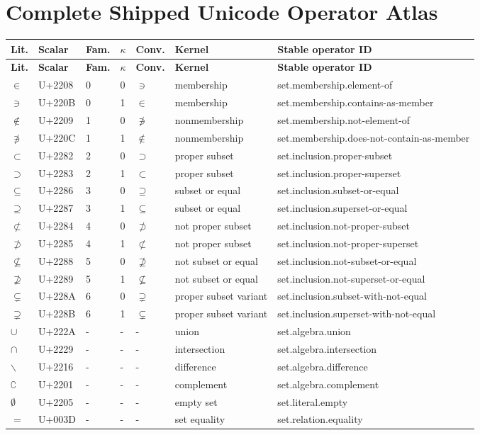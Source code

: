 \documentclass[11pt,a4paper]{article}
\begin{document}
\section{Complete Shipped Unicode Operator Atlas}
\small
{}
\begin{longtable}{P{7mm}P{18mm}P{10mm}P{10mm}P{10mm}P{27mm}P{65mm}}
\toprule
\textbf{Lit.} & \textbf{Scalar} & \textbf{Fam.} & \textbf{\(\kappa\)} & \textbf{Conv.} & \textbf{Kernel} & \textbf{Stable operator ID}\\
\midrule
\endfirsthead
\toprule
\textbf{Lit.} & \textbf{Scalar} & \textbf{Fam.} & \textbf{\(\kappa\)} & \textbf{Conv.} & \textbf{Kernel} & \textbf{Stable operator ID}\\
\midrule
\endhead
\bottomrule
\endlastfoot
\(∈\) & U+2208 & 0 & 0 & \(∋\) & membership & set.membership.element-of \\
\(∋\) & U+220B & 0 & 1 & \(∈\) & membership & set.membership.contains-as-member \\
\(∉\) & U+2209 & 1 & 0 & \(∌\) & nonmembership & set.membership.not-element-of \\
\(∌\) & U+220C & 1 & 1 & \(∉\) & nonmembership & set.membership.does-not-contain-as-member \\
\(⊂\) & U+2282 & 2 & 0 & \(⊃\) & proper subset & set.inclusion.proper-subset \\
\(⊃\) & U+2283 & 2 & 1 & \(⊂\) & proper subset & set.inclusion.proper-superset \\
\(⊆\) & U+2286 & 3 & 0 & \(⊇\) & subset or equal & set.inclusion.subset-or-equal \\
\(⊇\) & U+2287 & 3 & 1 & \(⊆\) & subset or equal & set.inclusion.superset-or-equal \\
\(⊄\) & U+2284 & 4 & 0 & \(⊅\) & not proper subset & set.inclusion.not-proper-subset \\
\(⊅\) & U+2285 & 4 & 1 & \(⊄\) & not proper subset & set.inclusion.not-proper-superset \\
\(⊈\) & U+2288 & 5 & 0 & \(⊉\) & not subset or equal & set.inclusion.not-subset-or-equal \\
\(⊉\) & U+2289 & 5 & 1 & \(⊈\) & not subset or equal & set.inclusion.not-superset-or-equal \\
\(⊊\) & U+228A & 6 & 0 & \(⊋\) & proper subset variant & set.inclusion.subset-with-not-equal \\
\(⊋\) & U+228B & 6 & 1 & \(⊊\) & proper subset variant & set.inclusion.superset-with-not-equal \\
\(∪\) & U+222A & - & - & - & union & set.algebra.union \\
\(∩\) & U+2229 & - & - & - & intersection & set.algebra.intersection \\
\(∖\) & U+2216 & - & - & - & difference & set.algebra.difference \\
\(∁\) & U+2201 & - & - & - & complement & set.algebra.complement \\
\(∅\) & U+2205 & - & - & - & empty set & set.literal.empty \\
\(=\) & U+003D & - & - & - & set equality & set.relation.equality \\
\end{longtable}
\normalsize
\end{document}
